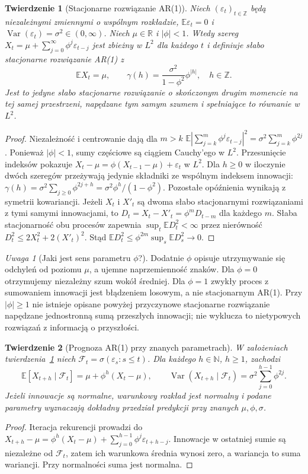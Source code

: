 \documentclass[11pt,a4paper,oneside]{report}
\numberwithin{equation}{chapter}
\theoremstyle{plain}
\newtheorem{twierdzenie}{Twierdzenie}[chapter]
\theoremstyle{definition}
\theoremstyle{remark}
\newtheorem{uwaga}{Uwaga}[chapter]
\newcommand{\R}{\mathbb R}
\newcommand{\N}{\mathbb N}
\newcommand{\E}{\mathbb E}
\newcommand{\Var}{\operatorname{Var}}
\begin{document}
\begin{twierdzenie}[Stacjonarne rozwiązanie AR(1)]
\label{thm:ar1-stationary}
Niech $(\varepsilon_t)_{t\in\mathbb Z}$ będą
niezależnymi zmiennymi o wspólnym rozkładzie,
$\E\varepsilon_t=0$ i
$\Var(\varepsilon_t)=\sigma^2\in(0,\infty)$.
Niech $\mu\in\R$ i $|\phi|<1$. Wtedy szereg
$X_t=\mu+\sum_{j=0}^{\infty}\phi^j\varepsilon_{t-j}$
jest zbieżny w $L^2$ dla każdego $t$ i definiuje
słabo stacjonarne rozwiązanie AR(1) z
\[
 \E X_t=\mu,\qquad
 \gamma(h)=\frac{\sigma^2}{1-\phi^2}\phi^{|h|},
 \quad h\in\mathbb Z.
\]
Jest to jedyne słabo stacjonarne rozwiązanie o skończonym
drugim momencie na tej samej przestrzeni, napędzane tym samym
szumem i spełniające to równanie w $L^2$.
\end{twierdzenie}
\begin{proof}
Niezależność i centrowanie dają dla $m>k$
$\E|\sum_{j=k}^m\phi^j\varepsilon_{t-j}|^2
=\sigma^2\sum_{j=k}^m\phi^{2j}$.
Ponieważ $|\phi|<1$, sumy częściowe są ciągiem
Cauchy'ego w $L^2$. Przesunięcie indeksów pokazuje
$X_t-\mu=\phi(X_{t-1}-\mu)+\varepsilon_t$ w $L^2$.
Dla $h\ge0$ w iloczynie dwóch szeregów przeżywają
jedynie składniki ze wspólnym indeksem innowacji:
$\gamma(h)=\sigma^2\sum_{j\ge0}\phi^{2j+h}
=\sigma^2\phi^h/(1-\phi^2)$. Pozostałe opóźnienia
wynikają z symetrii kowariancji.
Jeżeli $X_t$ i $X'_t$ są dwoma słabo stacjonarnymi
rozwiązaniami z tymi samymi innowacjami, to
$D_t=X_t-X'_t=\phi^mD_{t-m}$ dla każdego $m$.
Słaba stacjonarność obu procesów zapewnia
$\sup_t\E D_t^2<\infty$ przez nierówność
$D_t^2\le2X_t^2+2(X'_t)^2$.
Stąd $\E D_t^2\le\phi^{2m}\sup_s\E D_s^2\to0$.
\end{proof}

\begin{uwaga}[Jaki jest sens parametru $\phi$?]
Dodatnie $\phi$ opisuje utrzymywanie się odchyleń
od poziomu $\mu$, a ujemne naprzemienność znaków.
Dla $\phi=0$ otrzymujemy niezależny szum wokół średniej.
Dla $\phi=1$ zwykły proces z sumowaniem innowacji
jest błądzeniem losowym, a nie stacjonarnym AR(1).
Przy $|\phi|\ge1$ nie istnieje opisane powyżej
przyczynowe stacjonarne rozwiązanie napędzane
jednostronną sumą przeszłych innowacji; nie wyklucza
to nietypowych rozwiązań z informacją o przyszłości.
\end{uwaga}

\begin{twierdzenie}[Prognoza AR(1) przy znanych parametrach]
\label{thm:ar1-forecast}
W założeniach twierdzenia~\ref{thm:ar1-stationary}
niech $\mathcal F_t=\sigma(\varepsilon_s:s\le t)$.
Dla każdego $h\in\N$, $h\ge1$, zachodzi
\[
 \E[X_{t+h}\mid\mathcal F_t]
 =\mu+\phi^h(X_t-\mu),\qquad
 \Var(X_{t+h}\mid\mathcal F_t)
 =\sigma^2\sum_{j=0}^{h-1}\phi^{2j}.
\]
Jeżeli innowacje są normalne, warunkowy rozkład jest
normalny i podane parametry wyznaczają dokładny
przedział predykcji przy \emph{znanych} $\mu,\phi,\sigma$.
\end{twierdzenie}
\begin{proof}
Iteracja rekurencji prowadzi do
$X_{t+h}-\mu=\phi^h(X_t-\mu)+
\sum_{j=0}^{h-1}\phi^j\varepsilon_{t+h-j}$.
Innowacje w ostatniej sumie są niezależne od
$\mathcal F_t$, zatem ich warunkowa średnia
wynosi zero, a wariancja to suma wariancji.
Przy normalności suma jest normalna.
\end{proof}
\end{document}
